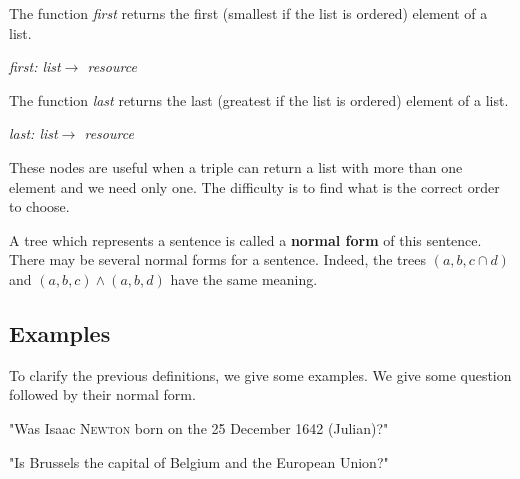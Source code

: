 The function \textsl{first} returns the first (smallest if the list is ordered) element of a list.

\begin{center}
\textsl{first: list$\rightarrow$ resource}
\end{center}

The function \textsl{last} returns the last (greatest if the list is ordered) element of a list.

\begin{center}
\textsl{last: list$\rightarrow$ resource}
\end{center}

These nodes are useful when a triple can return a list with more than one element and we need only one. The difficulty is to find what is the correct order to choose.

\bigskip

A tree which represents a sentence is called a 
{\bf normal form} of this sentence. There may be several normal forms for a sentence. Indeed, the trees $(a,b,c\cap d)$ and $(a,b,c)\wedge(a,b,d)$ have the same meaning.

\subsection{Examples}

To clarify the previous definitions, we give some examples. We give some question followed by their normal form.

\FloatBarrier
\bigskip

"Was Isaac \textsc{Newton} born on the 25 December 1642 (Julian)?"

\begin{figure}[!ht]
    \centering
\end{figure}

\FloatBarrier
\bigskip

"Is Brussels the capital of Belgium and the European Union?"

